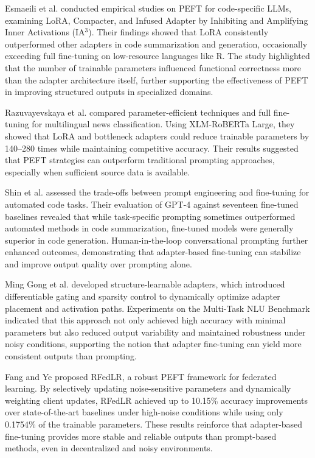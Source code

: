 \documentclass[journal,article,submit,pdftex,moreauthors]{Definitions/mdpi}
\begin{document}
Esmaeili et al. \citep{esmaeili2026empirical} conducted empirical studies on PEFT for code-specific LLMs, examining LoRA, Compacter, and Infused Adapter by Inhibiting and Amplifying Inner Activations (IA$^3$). Their findings showed that LoRA consistently outperformed other adapters in code summarization and generation, occasionally exceeding full fine-tuning on low-resource languages like R. The study highlighted that the number of trainable parameters influenced functional correctness more than the adapter architecture itself, further supporting the effectiveness of PEFT in improving structured outputs in specialized domains.

Razuvayevskaya et al. \citep{razuvayevskaya2024comparison} compared parameter-efficient techniques and full fine-tuning for multilingual news classification. Using XLM-RoBERTa Large, they showed that LoRA and bottleneck adapters could reduce trainable parameters by 140–280 times while maintaining competitive accuracy. Their results suggested that PEFT strategies can outperform traditional prompting approaches, especially when sufficient source data is available.

Shin et al. \citep{shin2025prompt} assessed the trade-offs between prompt engineering and fine-tuning for automated code tasks. Their evaluation of GPT-4 against seventeen fine-tuned baselines revealed that while task-specific prompting sometimes outperformed automated methods in code summarization, fine-tuned models were generally superior in code generation. Human-in-the-loop conversational prompting further enhanced outcomes, demonstrating that adapter-based fine-tuning can stabilize and improve output quality over prompting alone.

Ming Gong et al. \citep{gong2025structure} developed structure-learnable adapters, which introduced differentiable gating and sparsity control to dynamically optimize adapter placement and activation paths. Experiments on the Multi-Task NLU Benchmark indicated that this approach not only achieved high accuracy with minimal parameters but also reduced output variability and maintained robustness under noisy conditions, supporting the notion that adapter fine-tuning can yield more consistent outputs than prompting.

Fang and Ye \citep{fangtowards} proposed RFedLR, a robust PEFT framework for federated learning. By selectively updating noise-sensitive parameters and dynamically weighting client updates, RFedLR achieved up to 10.15\% accuracy improvements over state-of-the-art baselines under high-noise conditions while using only 0.1754\% of the trainable parameters. These results reinforce that adapter-based fine-tuning provides more stable and reliable outputs than prompt-based methods, even in decentralized and noisy environments.
\end{document}

